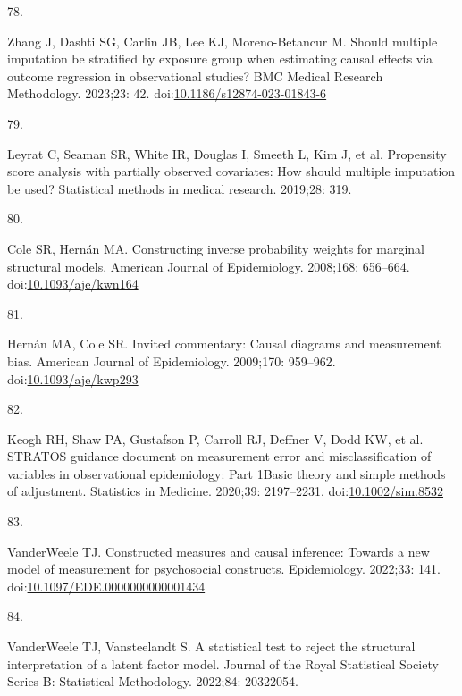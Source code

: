 \documentclass[
  singlecolumn]{article}
\newlength{\cslhangindent}
\newlength{\csllabelwidth}
\newlength{\cslentryspacingunit} %
\newenvironment{CSLReferences}[2] %
 {%
  \setlength{\parindent}{0pt}
  \ifodd #1
  \let\oldpar\par
  \def\par{\hangindent=\cslhangindent\oldpar}
  \fi
  \setlength{\parskip}{#2\cslentryspacingunit}
 }%
 {}
\newcommand{\CSLLeftMargin}[1]{\parbox[t]{\csllabelwidth}{#1}}
\newcommand{\CSLRightInline}[1]{\parbox[t]{\linewidth - \csllabelwidth}{#1}\break}
\begin{document}
\begin{CSLReferences}{0}{0}
\leavevmode{}%
\CSLLeftMargin{78. }%
\CSLRightInline{Zhang J, Dashti SG, Carlin JB, Lee KJ, Moreno-Betancur
M. Should multiple imputation be stratified by exposure group when
estimating causal effects via outcome regression in observational
studies? BMC Medical Research Methodology. 2023;23: 42.
doi:\href{https://doi.org/10.1186/s12874-023-01843-6}{10.1186/s12874-023-01843-6}}

\leavevmode{}%
\CSLLeftMargin{79. }%
\CSLRightInline{Leyrat C, Seaman SR, White IR, Douglas I, Smeeth L, Kim
J, et al. Propensity score analysis with partially observed covariates:
How should multiple imputation be used? Statistical methods in medical
research. 2019;28: 319. }

\leavevmode{}%
\CSLLeftMargin{80. }%
\CSLRightInline{Cole SR, Hernán MA. Constructing inverse probability
weights for marginal structural models. American Journal of
Epidemiology. 2008;168: 656--664.
doi:\href{https://doi.org/10.1093/aje/kwn164}{10.1093/aje/kwn164}}

\leavevmode{}%
\CSLLeftMargin{81. }%
\CSLRightInline{Hernán MA, Cole SR. Invited commentary: Causal diagrams
and measurement bias. American Journal of Epidemiology. 2009;170:
959--962.
doi:\href{https://doi.org/10.1093/aje/kwp293}{10.1093/aje/kwp293}}

\leavevmode{}%
\CSLLeftMargin{82. }%
\CSLRightInline{Keogh RH, Shaw PA, Gustafson P, Carroll RJ, Deffner V,
Dodd KW, et al. STRATOS guidance document on measurement error and
misclassification of variables in observational epidemiology: Part
1{\textemdash}Basic theory and simple methods of adjustment. Statistics
in Medicine. 2020;39: 2197--2231.
doi:\href{https://doi.org/10.1002/sim.8532}{10.1002/sim.8532}}

\leavevmode{}%
\CSLLeftMargin{83. }%
\CSLRightInline{VanderWeele TJ. Constructed measures and causal
inference: Towards a new model of measurement for psychosocial
constructs. Epidemiology. 2022;33: 141.
doi:\href{https://doi.org/10.1097/EDE.0000000000001434}{10.1097/EDE.0000000000001434}}

\leavevmode{}%
\CSLLeftMargin{84. }%
\CSLRightInline{VanderWeele TJ, Vansteelandt S. A statistical test to
reject the structural interpretation of a latent factor model. Journal
of the Royal Statistical Society Series B: Statistical Methodology.
2022;84: 20322054. }


\end{CSLReferences}
\end{document}
